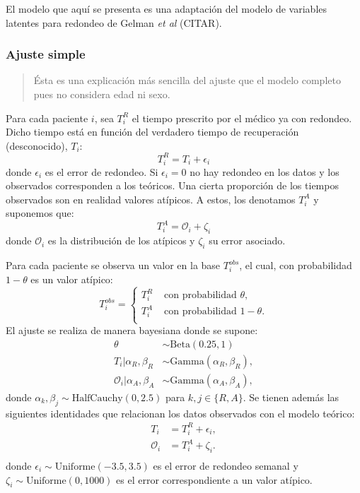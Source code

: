\documentclass[
]{article}
\begin{document}
El modelo que aquí se presenta es una adaptación del modelo de variables
latentes para redondeo de Gelman \emph{et al} (CITAR).

\hypertarget{ajuste-simple}{%
\subsubsection{Ajuste simple}\label{ajuste-simple}}

\begin{quote}
Ésta es una explicación más sencilla del ajuste que el modelo completo
pues no considera edad ni sexo.
\end{quote}

Para cada paciente \(i\), sea \(T^{R}_i\) el tiempo prescrito por el
médico ya con redondeo. Dicho tiempo está en función del verdadero
tiempo de recuperación (desconocido), \(T_i\): \[
T^{R}_i = T_i + \epsilon_i
\] donde \(\epsilon_i\) es el error de redondeo. Si \(\epsilon_i = 0\)
no hay redondeo en los datos y los observados corresponden a los
teóricos. Una cierta proporción de los tiempos observados son en
realidad valores atípicos. A estos, los denotamos \(T_i^{A}\) y
suponemos que: \[
T_i^{A} = \mathcal{O}_i + \zeta_i
\] donde \(\mathcal{O}_i\) es la distribución de los atípicos y
\(\zeta_i\) su error asociado.

Para cada paciente se observa un valor en la base \(T_i^{obs}\), el
cual, con probabilidad \(1 - \theta\) es un valor atípico: \[
T_i^{obs} = \begin{cases}
T_i^{R} & \textrm{ con probabilidad } \theta, \\
T_i^{A} & \textrm{ con probabilidad } 1 - \theta. \\
\end{cases}
\] El ajuste se realiza de manera bayesiana donde se supone:
\begin{equation}
\begin{aligned}
\theta & \sim \textrm{Beta}(0.25,1) \\
T_i|\alpha_R,\beta_R          & \sim \textrm{Gamma}(\alpha_R, \beta_R), \\
\mathcal{O}_i|\alpha_A,\beta_A & \sim \textrm{Gamma}(\alpha_A, \beta_A),
\end{aligned}
\end{equation} donde
\(\alpha_k, \beta_j \sim \textrm{HalfCauchy}(0, 2.5)\) para
\(k,j \in \{R,A\}\). Se tienen además las siguientes identidades que
relacionan los datos observados con el modelo teórico: \begin{equation}
\begin{aligned}
T_i & = T_i^{R} + \epsilon_i, \\
\mathcal{O}_i & = T_i^{A} + \zeta_i. \\
\end{aligned}
\end{equation} donde \(\epsilon_i\sim\textrm{Uniforme}(-3.5,3.5)\) es el
error de redondeo semanal y \(\zeta_i\sim\textrm{Uniforme}(0,1000)\) es
el error correspondiente a un valor atípico.
\end{document}
